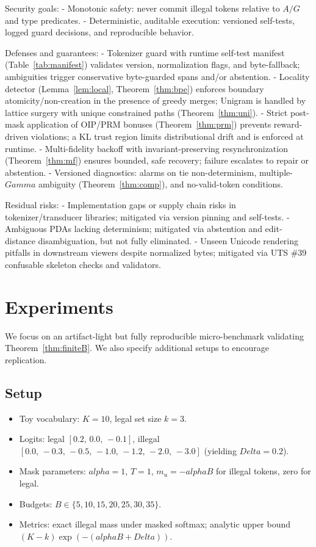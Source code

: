 \documentclass{article}
\def\alpha{alpha}%
\def\Delta{Delta}%
\def\Gamma{Gamma}%
\def\mathcal#1{#1}%
\begin{document}
Security goals:
- Monotonic safety: never commit illegal tokens relative to $\mathcal{A}/\mathcal{G}$ and type predicates.
- Deterministic, auditable execution: versioned self-tests, logged guard decisions, and reproducible behavior.

Defenses and guarantees:
- Tokenizer guard with runtime self-test manifest (Table~\ref{tab:manifest}) validates version, normalization flags, and byte-fallback; ambiguities trigger conservative byte-guarded spans and/or abstention.
- Locality detector (Lemma~\ref{lem:local}, Theorem~\ref{thm:bpe}) enforces boundary atomicity/non-creation in the presence of greedy merges; Unigram is handled by lattice surgery with unique constrained paths (Theorem~\ref{thm:uni}).
- Strict post-mask application of OIP/PRM bonuses (Theorem~\ref{thm:prm}) prevents reward-driven violations; a KL trust region limits distributional drift and is enforced at runtime.
- Multi-fidelity backoff with invariant-preserving resynchronization (Theorem~\ref{thm:mf}) ensures bounded, safe recovery; failure escalates to repair or abstention.
- Versioned diagnostics: alarms on tie non-determinism, multiple-$\Gamma$ ambiguity (Theorem~\ref{thm:comp}), and no-valid-token conditions.

Residual risks:
- Implementation gaps or supply chain risks in tokenizer/transducer libraries; mitigated via version pinning and self-tests.
- Ambiguous PDAs lacking determinism; mitigated via abstention and edit-distance disambiguation, but not fully eliminated.
- Unseen Unicode rendering pitfalls in downstream viewers despite normalized bytes; mitigated via UTS \#39 confusable skeleton checks and validators.

\section{Experiments}\label{sec:experiments}
We focus on an artifact-light but fully reproducible micro-benchmark validating Theorem~\ref{thm:finiteB}. We also specify additional setups to encourage replication.

\subsection{Setup}
\begin{itemize}[leftmargin=*]
\item Toy vocabulary: $K=10$, legal set size $k=3$.
\item Logits: legal $[0.2,\,0.0,\,-0.1]$, illegal $[0.0,\,-0.3,\,-0.5,\,-1.0,\,-1.2,\,-2.0,\,-3.0]$ (yielding $\Delta=0.2$).
\item Mask parameters: $\alpha=1$, $T=1$, $m_u=-\alpha B$ for illegal tokens, zero for legal.
\item Budgets: $B\in\{5,10,15,20,25,30,35\}$.
\item Metrics: exact illegal mass under masked softmax; analytic upper bound $(K-k)\exp(-(\alpha B+\Delta))$.
\end{itemize}
\end{document}
